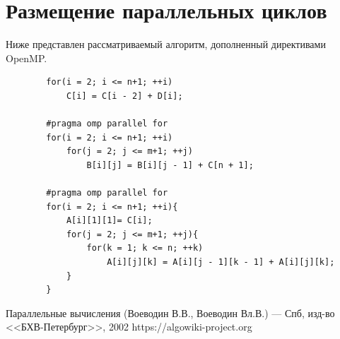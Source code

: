     \section{Размещение параллельных циклов}
    Ниже представлен рассматриваемый алгоритм, дополненный директивами OpenMP.

    \begin{verbatim}
        for(i = 2; i <= n+1; ++i)
            C[i] = C[i - 2] + D[i];
        
        #pragma omp parallel for
        for(i = 2; i <= n+1; ++i)
            for(j = 2; j <= m+1; ++j)
                B[i][j] = B[i][j - 1] + C[n + 1];
        
        #pragma omp parallel for
        for(i = 2; i <= n+1; ++i){
            A[i][1][1]= C[i];
            for(j = 2; j <= m+1; ++j){
                for(k = 1; k <= n; ++k)
                    A[i][j][k] = A[i][j - 1][k - 1] + A[i][j][k];
            }
        }
        \end{verbatim}
    \begin{thebibliography}{9}
             Параллельные вычисления (Воеводин В.В., Воеводин Вл.В.) --- Спб, изд-во <<БХВ-Петербург>>, 2002
             https://algowiki-project.org 
    \end{thebibliography} 
